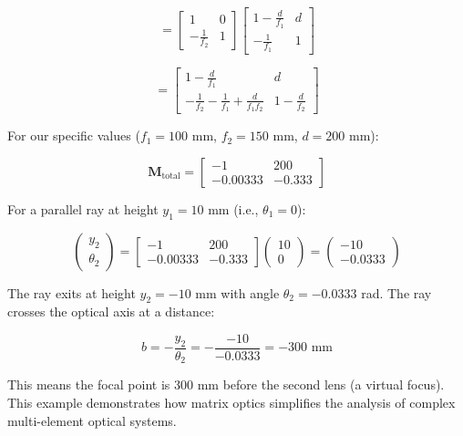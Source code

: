 \documentclass[
  a4paper,
]{book}
\begin{document}
\begin{tcolorbox}
\[
= \begin{bmatrix} 1 & 0 \\ -\frac{1}{f_2} & 1 \end{bmatrix} \begin{bmatrix} 1 - \frac{d}{f_1} & d \\ -\frac{1}{f_1} & 1 \end{bmatrix}
\]

\[
= \begin{bmatrix} 1 - \frac{d}{f_1} & d \\ -\frac{1}{f_2} - \frac{1}{f_1} + \frac{d}{f_1 f_2} & 1 - \frac{d}{f_2} \end{bmatrix}
\]

For our specific values (\(f_1 = 100\) mm, \(f_2 = 150\) mm, \(d = 200\)
mm):

\[
\mathbf{M}_{\text{total}} = \begin{bmatrix} -1 & 200 \\ -0.00333 & -0.333 \end{bmatrix}
\]

For a parallel ray at height \(y_1 = 10\) mm (i.e., \(\theta_1 = 0\)):

\[
\begin{pmatrix} y_2 \\ \theta_2 \end{pmatrix} = \begin{bmatrix} -1 & 200 \\ -0.00333 & -0.333 \end{bmatrix} \begin{pmatrix} 10 \\ 0 \end{pmatrix} = \begin{pmatrix} -10 \\ -0.0333 \end{pmatrix}
\]

The ray exits at height \(y_2 = -10\) mm with angle
\(\theta_2 = -0.0333\) rad. The ray crosses the optical axis at a
distance:

\[
b = -\frac{y_2}{\theta_2} = -\frac{-10}{-0.0333} = -300 \text{ mm}
\]

This means the focal point is 300 mm before the second lens (a virtual
focus). This example demonstrates how matrix optics simplifies the
analysis of complex multi-element optical systems.

\end{tcolorbox}
\end{document}
